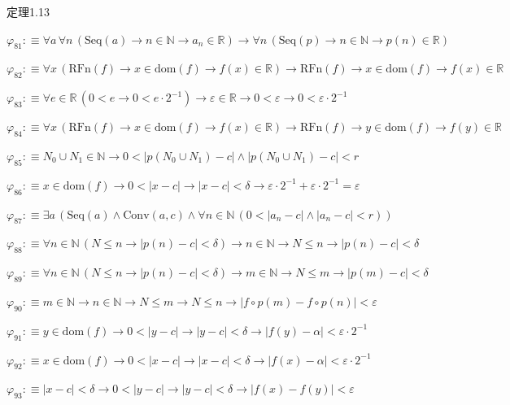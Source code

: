 \begin{fullproof}{定理1.13}
\begin{abbrevlist}
\item $\varphi_{81} :\equiv \forall a\,\forall n\,(\mathrm{Seq}(a) \to n \in \mathbb{N} \to a_{n} \in \mathbb{R}) \to \forall n\,(\mathrm{Seq}(p) \to n \in \mathbb{N} \to p(n) \in \mathbb{R})$
\item $\varphi_{82} :\equiv \forall x\,(\mathrm{RFn}(f) \to x \in \mathrm{dom}(f) \to f(x) \in \mathbb{R}) \to \mathrm{RFn}(f) \to x \in \mathrm{dom}(f) \to f(x) \in \mathbb{R}$
\item $\varphi_{83} :\equiv \forall e \in \mathbb{R}\,(0 < e \to 0 < e \cdot 2^{-1}) \to \varepsilon \in \mathbb{R} \to 0 < \varepsilon \to 0 < \varepsilon \cdot 2^{-1}$
\item $\varphi_{84} :\equiv \forall x\,(\mathrm{RFn}(f) \to x \in \mathrm{dom}(f) \to f(x) \in \mathbb{R}) \to \mathrm{RFn}(f) \to y \in \mathrm{dom}(f) \to f(y) \in \mathbb{R}$
\item $\varphi_{85} :\equiv N_{0} \cup N_{1} \in \mathbb{N} \to 0 < \lvert p(N_{0} \cup N_{1}) - c \rvert \land \lvert p(N_{0} \cup N_{1}) - c \rvert < r$
\item $\varphi_{86} :\equiv x \in \mathrm{dom}(f) \to 0 < \lvert x - c \rvert \to \lvert x - c \rvert < \delta \to \varepsilon \cdot 2^{-1} + \varepsilon \cdot 2^{-1} = \varepsilon$
\item $\varphi_{87} :\equiv \exists a\,(\mathrm{Seq}(a) \land \mathrm{Conv}(a,c) \land \forall n \in \mathbb{N}\,(0 < \lvert a_{n} - c \rvert \land \lvert a_{n} - c \rvert < r))$
\item $\varphi_{88} :\equiv \forall n \in \mathbb{N}\,(N \leq n \to \lvert p(n) - c \rvert < \delta) \to n \in \mathbb{N} \to N \leq n \to \lvert p(n) - c \rvert < \delta$
\item $\varphi_{89} :\equiv \forall n \in \mathbb{N}\,(N \leq n \to \lvert p(n) - c \rvert < \delta) \to m \in \mathbb{N} \to N \leq m \to \lvert p(m) - c \rvert < \delta$
\item $\varphi_{90} :\equiv m \in \mathbb{N} \to n \in \mathbb{N} \to N \leq m \to N \leq n \to \lvert f \circ p(m) - f \circ p(n) \rvert < \varepsilon$
\item $\varphi_{91} :\equiv y \in \mathrm{dom}(f) \to 0 < \lvert y - c \rvert \to \lvert y - c \rvert < \delta \to \lvert f(y) - \alpha \rvert < \varepsilon \cdot 2^{-1}$
\item $\varphi_{92} :\equiv x \in \mathrm{dom}(f) \to 0 < \lvert x - c \rvert \to \lvert x - c \rvert < \delta \to \lvert f(x) - \alpha \rvert < \varepsilon \cdot 2^{-1}$
\item $\varphi_{93} :\equiv \lvert x - c \rvert < \delta \to 0 < \lvert y - c \rvert \to \lvert y - c \rvert < \delta \to \lvert f(x) - f(y) \rvert < \varepsilon$

\end{abbrevlist}
\end{fullproof}
